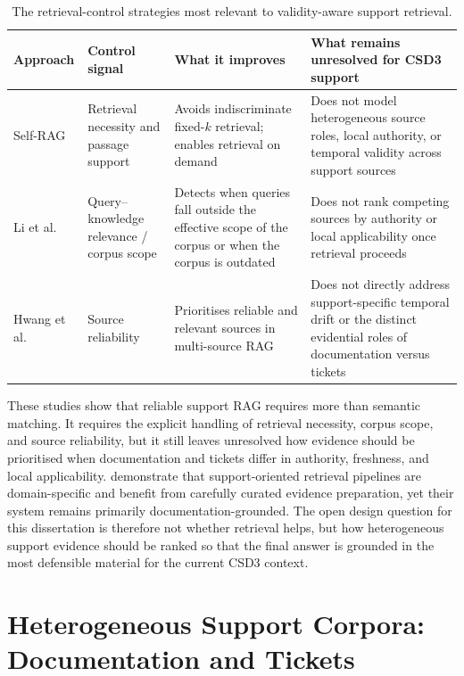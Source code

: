 \begin{table}[t]
\centering
\small
\setlength{\tabcolsep}{4pt}
\begin{tabular}{p{2.5cm} p{2.6cm} p{3.0cm} p{4.0cm}}
\hline
Approach & Control signal & What it improves & What remains unresolved for \ac{CSD3} support \\
\hline
Self-RAG \citep{asaiSelfRAGLearningRetrieve2023} &
Retrieval necessity and passage support &
Avoids indiscriminate fixed-$k$ retrieval; enables retrieval on demand &
Does not model heterogeneous source roles, local authority, or temporal validity across support sources \\
Li et al. \citep{liYouKnowWhat2024} &
Query--knowledge relevance / corpus scope &
Detects when queries fall outside the effective scope of the corpus or when the corpus is outdated &
Does not rank competing sources by authority or local applicability once retrieval proceeds \\
Hwang et al. \citep{hwangRetrievalAugmentedGenerationEstimation2025} &
Source reliability &
Prioritises reliable and relevant sources in multi-source \ac{RAG} &
Does not directly address support-specific temporal drift or the distinct evidential roles of documentation versus tickets \\
\hline
\end{tabular}
\caption{The retrieval-control strategies most relevant to validity-aware support retrieval.}
\label{tab:retrieval-control-comparison}
\end{table}

These studies show that reliable support \ac{RAG} requires more than semantic matching. It requires the explicit handling of retrieval necessity, corpus scope, and source reliability, but it still leaves unresolved how evidence should be prioritised when documentation and tickets differ in authority, freshness, and local applicability. \citet{AskHPC} demonstrate that support-oriented retrieval pipelines are domain-specific and benefit from carefully curated evidence preparation, yet their system remains primarily documentation-grounded. The open design question for this dissertation is therefore not whether retrieval helps, but how heterogeneous support evidence should be ranked so that the final answer is grounded in the most defensible material for the current \ac{CSD3} context. 

\section{Heterogeneous Support Corpora: Documentation and Tickets}
\label{sec:heterogeneous}

